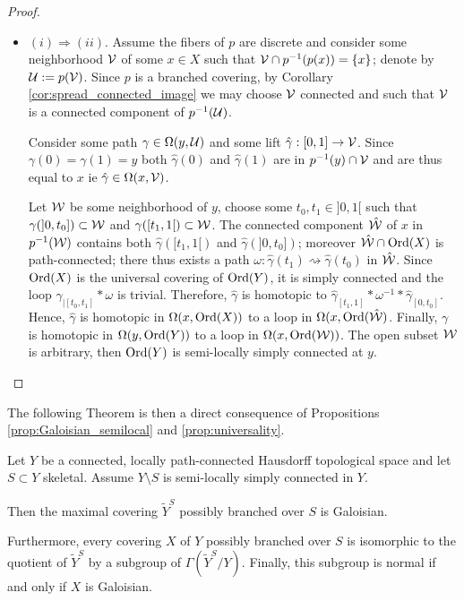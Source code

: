\begin{proof}
\begin{itemize}
 
 
 \item $(i)\Rightarrow (ii)$. Assume the fibers of $p$ are discrete and consider some neighborhood $\mathcal V$ of some $x\in X$ such that $\mathcal V\cap p^{-1}(p(x))=\{x\}$; denote by $\mathcal{U}:=p(\mathcal V)$. Since $p$ is a branched covering, by Corollary \ref{cor:spread_connected_image} we may choose $\mathcal V$ connected and such that $\mathcal V$ is a connected component of $p^{-1}(\mathcal{U})$. 
 
 Consider some path $\gamma \in \Omega(y,\mathcal{U})$ and some lift $\hat\gamma : [0,1]\rightarrow \mathcal V$. Since $\gamma(0)=\gamma(1)=y$ both $\hat\gamma(0)$ and $\hat \gamma(1)$ are in $p^{-1}(y)\cap \mathcal V$ and are thus equal to $x$ ie $\hat\gamma \in \Omega(x,\mathcal V)$. 
 
 Let $\mathcal W$ be some neighborhood of $y$, choose some $t_0,t_1 \in ]0,1[$ such that $\gamma(]0,t_0])\subset \mathcal W$ and $\gamma([t_1,1[)\subset \mathcal W$. The connected component $\hat{\mathcal W}$ of $x$ in $p^{-1}(\mathcal W)$ contains both $\hat\gamma([t_1,1[)$ and $\hat\gamma(]0,t_0])$; moreover $\hat{\mathcal W}\cap \mathrm{Ord}(X)$ is path-connected; there thus exists a path $\omega:\hat\gamma(t_1)\rightsquigarrow \hat\gamma(t_0)$ in $\hat{\mathcal W}$. Since $\mathrm{Ord}(X)$ is the universal covering of $\mathrm{Ord}(Y)$, it is simply connected and the loop $\gamma_{|[t_0,t_1]}* \omega$ is trivial. Therefore, $\hat\gamma$ is homotopic to $\hat\gamma_{[t_1,1]}* \omega^{-1} * \hat\gamma_{[0,t_0]}$.  Hence, $\hat\gamma$ is homotopic in $\Omega(x,\mathrm{Ord}(X))$ to a loop in $\Omega(x,\mathrm{Ord}(\hat{\mathcal W})$. Finally, $\gamma$ is homotopic in $\Omega(y,\mathrm{Ord}(Y))$ to a loop in $\Omega(x,\mathrm{Ord}(\mathcal W))$. The open subset $\mathcal W$ is arbitrary, then $\mathrm{Ord}(Y)$ is semi-locally simply connected at $y$.
 
  \end{itemize}
\end{proof}





The following Theorem is then a direct consequence of Propositions \ref{prop:Galoisian_semilocal} and \ref{prop:universality}.
\begin{thm}\label{theo:Galois_cor}
 Let $Y$ be a connected, locally path-connected Hausdorff topological space and let $S\subset Y$ skeletal.
 Assume $Y\setminus S$ is semi-locally simply connected in $Y$. 
 
 Then the maximal covering $\widetilde Y^S$ possibly branched over $S$ is Galoisian. 

 Furthermore, every covering $X$ of $Y$ possibly branched over $S$ is isomorphic to the quotient of $\widetilde{Y}^S$ by a subgroup of $\Gamma(\widetilde{Y}^S/Y)$. 
 Finally, this subgroup is normal if and only if $X$ is Galoisian.
\end{thm}

